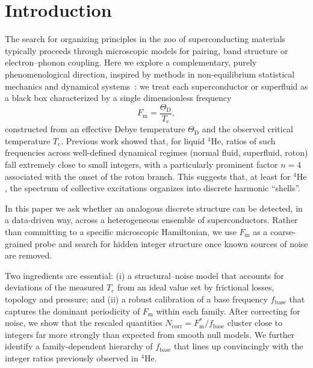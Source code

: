 \documentclass[aps,prb,twocolumn,superscriptaddress,floatfix,nofootinbib]{revtex4-2}
\newcommand{\Tc}{\ensuremath{T_{\mathrm{c}}}}
\newcommand{\ThetaD}{\ensuremath{\Theta_{\mathrm{D}}}}
\newcommand{\Fm}{\ensuremath{F_{\mathrm{m}}}}
\newcommand{\Fmstar}{\ensuremath{{F_{\mathrm{m}}^{\ast}}}}
\newcommand{\fbase}{\ensuremath{{f_{\mathrm{base}}}}}
\newcommand{\Ncorr}{\ensuremath{{N_{\mathrm{corr}}}}}
\newcommand{\He}{\ensuremath{\mathrm{He}}}
\newcommand{\HeFour}{\ensuremath{{^{4}\He}}}
\begin{document}
\maketitle

\section{Introduction}
\label{sec:intro}

The search for organizing principles in the zoo of superconducting
materials typically proceeds through microscopic models for pairing,
band structure or electron--phonon coupling\cite{BCS1957,Tinkham1996}.
Here we explore a complementary, purely phenomenological direction,
inspired by methods in non-equilibrium statistical mechanics and
dynamical systems~\cite{Mori1965,Zwanzig2001,Pikovsky2001,GuckenheimerHolmes1983}:
we treat each superconductor or superfluid as a black box characterized
by a single dimensionless frequency
\begin{equation}
  \Fm = \frac{\ThetaD}{\Tc},
\end{equation}
constructed from an effective Debye temperature $\ThetaD$ and
the observed critical temperature $\Tc$.
Previous work \cite{Agostino2025_Study01} showed that, for liquid \HeFour, ratios of such
frequencies across well-defined dynamical regimes (normal fluid, superfluid, roton)
fall extremely close to small integers, with a particularly prominent
factor $n = 4$ associated with the onset of the roton branch.
This suggests that, at least for \HeFour, the spectrum of collective excitations
organizes into discrete harmonic ``shells''.

In this paper we ask whether an analogous discrete structure can be detected,
in a data-driven way, across a heterogeneous ensemble of superconductors.
Rather than committing to a specific microscopic Hamiltonian,
we use $\Fm$ as a coarse-grained probe and search for hidden
integer structure once known sources of noise are removed.

Two ingredients are essential:
(i) a structural--noise model that accounts for deviations of the
measured $\Tc$ from an ideal value set by frictional losses, topology
and pressure; and
(ii) a robust calibration of a base frequency $\fbase$ that captures
the dominant periodicity of $\Fm$ within each family.
After correcting for noise, we show that the rescaled quantities
$\Ncorr = \Fmstar / \fbase$ cluster close to integers
far more strongly than expected from smooth null models.
We further identify a family-dependent hierarchy of
$\fbase$ that lines up convincingly with the integer ratios
previously observed in \HeFour.
\end{document}
